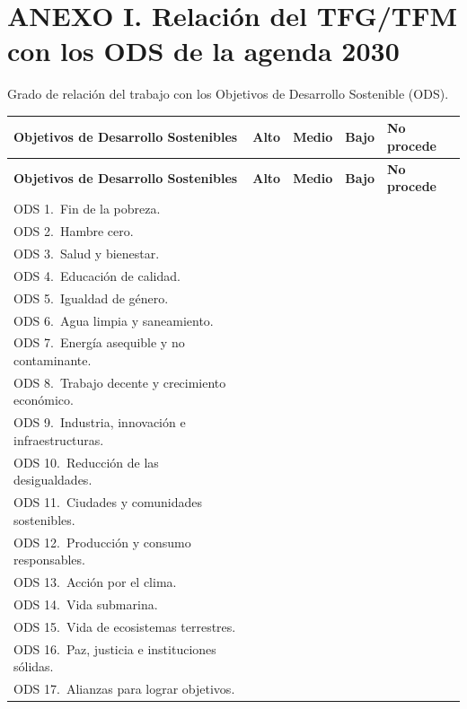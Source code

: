 
\chapter*{ANEXO I. Relación del TFG/TFM con los ODS de la agenda 2030}

Grado de relación del trabajo con los Objetivos de Desarrollo Sostenible (ODS).

\renewcommand{\arraystretch}{1.35}
\begin{longtable}{|p{6.7cm}|>{\centering\arraybackslash}p{1.5cm}|>{\centering\arraybackslash}p{1.5cm}|>{\centering\arraybackslash}p{1.5cm}|>{\centering\arraybackslash}p{1.8cm}|}
\hline
\textbf{Objetivos de Desarrollo Sostenibles} & \textbf{Alto} & \textbf{Medio} & \textbf{Bajo} & \textbf{No procede} \\
\hline
\endfirsthead
\hline
\textbf{Objetivos de Desarrollo Sostenibles} & \textbf{Alto} & \textbf{Medio} & \textbf{Bajo} & \textbf{No procede} \\
\hline
\endhead
ODS 1.\ Fin de la pobreza. & & & & \\
\hline
ODS 2.\ Hambre cero. & & & & \\
\hline
ODS 3.\ Salud y bienestar. & & & & \\
\hline
ODS 4.\ Educación de calidad. & & & & \\
\hline
ODS 5.\ Igualdad de género. & & & & \\
\hline
ODS 6.\ Agua limpia y saneamiento. & & & & \\
\hline
ODS 7.\ Energía asequible y no contaminante. & & & & \\
\hline
ODS 8.\ Trabajo decente y crecimiento económico. & & & & \\
\hline
ODS 9.\ Industria, innovación e infraestructuras. & & & & \\
\hline
ODS 10.\ Reducción de las desigualdades. & & & & \\
\hline
ODS 11.\ Ciudades y comunidades sostenibles. & & & & \\
\hline
ODS 12.\ Producción y consumo responsables. & & & & \\
\hline
ODS 13.\ Acción por el clima. & & & & \\
\hline
ODS 14.\ Vida submarina. & & & & \\
\hline
ODS 15.\ Vida de ecosistemas terrestres. & & & & \\
\hline
ODS 16.\ Paz, justicia e instituciones sólidas. & & & & \\
\hline
ODS 17.\ Alianzas para lograr objetivos. & & & & \\
\hline
\end{longtable}

